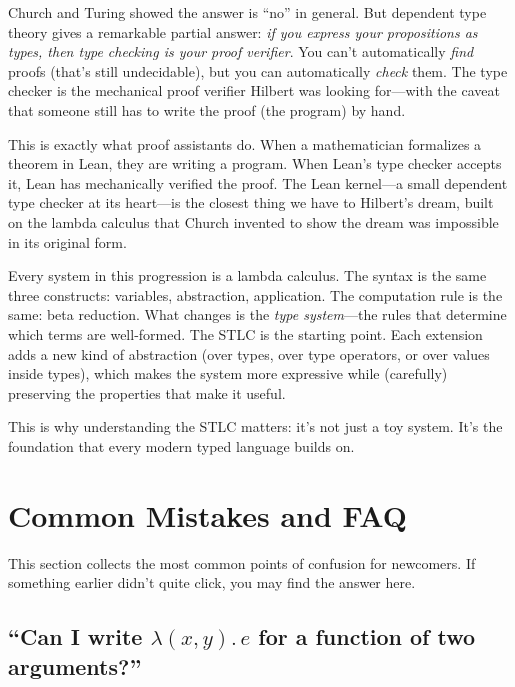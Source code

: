 \documentclass[11pt,a4paper]{article}
\theoremstyle{definition}
\newcommand{\lam}{\lambda}
\begin{document}
Church and Turing showed the answer is ``no'' in general. But dependent type
theory gives a remarkable partial answer: \emph{if you express your
propositions as types, then type checking is your proof verifier}. You can't
automatically \emph{find} proofs (that's still undecidable), but you can
automatically \emph{check} them. The type checker is the mechanical proof
verifier Hilbert was looking for---with the caveat that someone still has to
write the proof (the program) by hand.

This is exactly what proof assistants do. When a mathematician formalizes a
theorem in Lean, they are writing a program. When Lean's type checker accepts
it, Lean has mechanically verified the proof. The Lean kernel---a small
dependent type checker at its heart---is the closest thing we have to
Hilbert's dream, built on the lambda calculus that Church invented to show
the dream was impossible in its original form.

\begin{intuition}
Every system in this progression is a lambda calculus. The syntax is the same
three constructs: variables, abstraction, application. The computation rule is
the same: beta reduction. What changes is the \emph{type system}---the rules
that determine which terms are well-formed. The STLC is the starting point.
Each extension adds a new kind of abstraction (over types, over type operators,
or over values inside types), which makes the system more expressive while
(carefully) preserving the properties that make it useful.

This is why understanding the STLC matters: it's not just a toy system. It's
the foundation that every modern typed language builds on.
\end{intuition}

\section{Common Mistakes and FAQ}\label{sec:faq}

This section collects the most common points of confusion for newcomers. If
something earlier didn't quite click, you may find the answer here.

\subsection{``Can I write $\lam(x, y).\, e$ for a function of two arguments?''}
\end{document}
